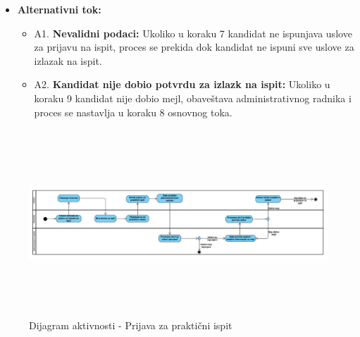 \begin{itemize}
\item \textbf{Alternativni tok:}  
   \begin{itemize}
   \item A1. \textbf{Nevalidni podaci:}
  Ukoliko u koraku 7 kandidat ne ispunjava uslove za prijavu na ispit, proces se prekida dok kandidat ne ispuni sve uslove za izlazak na ispit.
  \item A2. \textbf{Kandidat nije dobio potvrdu za izlazk na ispit:}
  Ukoliko u koraku 9 kandidat nije dobio mejl, obaveštava administrativnog radnika i proces se nastavlja u koraku 8 osnovnog toka.
   \end{itemize}

\end{itemize}  

\begin{figure}[H]
  \begin{center}
      \includegraphics[width=170mm, height=70mm]{Diagrams/dijagram_aktivnosti_prijava_za_praktican_ispit.png}
  \end{center}
  \caption {Dijagram aktivnosti - Prijava za praktični ispit}
  \label{activity_prijava_za_prakticni_ispit}

\end{figure}
